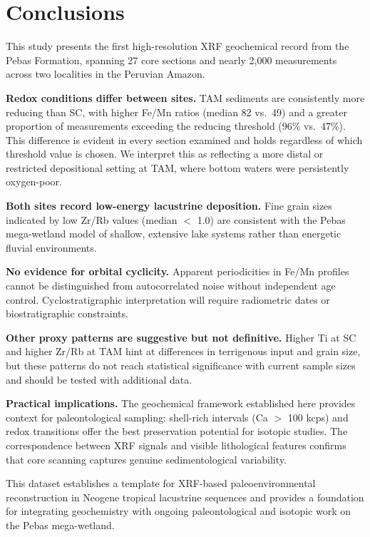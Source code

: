 \documentclass[11pt,a4paper]{article}
\begin{document}
\section{Conclusions}

This study presents the first high-resolution XRF geochemical record from the Pebas Formation, spanning 27 core sections and nearly 2,000 measurements across two localities in the Peruvian Amazon.

\textbf{Redox conditions differ between sites.} TAM sediments are consistently more reducing than SC, with higher Fe/Mn ratios (median 82 vs.\ 49) and a greater proportion of measurements exceeding the reducing threshold (96\% vs.\ 47\%). This difference is evident in every section examined and holds regardless of which threshold value is chosen. We interpret this as reflecting a more distal or restricted depositional setting at TAM, where bottom waters were persistently oxygen-poor.

\textbf{Both sites record low-energy lacustrine deposition.} Fine grain sizes indicated by low Zr/Rb values (median $<$ 1.0) are consistent with the Pebas mega-wetland model of shallow, extensive lake systems rather than energetic fluvial environments.

\textbf{No evidence for orbital cyclicity.} Apparent periodicities in Fe/Mn profiles cannot be distinguished from autocorrelated noise without independent age control. Cyclostratigraphic interpretation will require radiometric dates or biostratigraphic constraints.

\textbf{Other proxy patterns are suggestive but not definitive.} Higher Ti at SC and higher Zr/Rb at TAM hint at differences in terrigenous input and grain size, but these patterns do not reach statistical significance with current sample sizes and should be tested with additional data.

\textbf{Practical implications.} The geochemical framework established here provides context for paleontological sampling: shell-rich intervals (Ca $>$ 100 kcps) and redox transitions offer the best preservation potential for isotopic studies. The correspondence between XRF signals and visible lithological features confirms that core scanning captures genuine sedimentological variability.

This dataset establishes a template for XRF-based paleoenvironmental reconstruction in Neogene tropical lacustrine sequences and provides a foundation for integrating geochemistry with ongoing paleontological and isotopic work on the Pebas mega-wetland.
\end{document}
